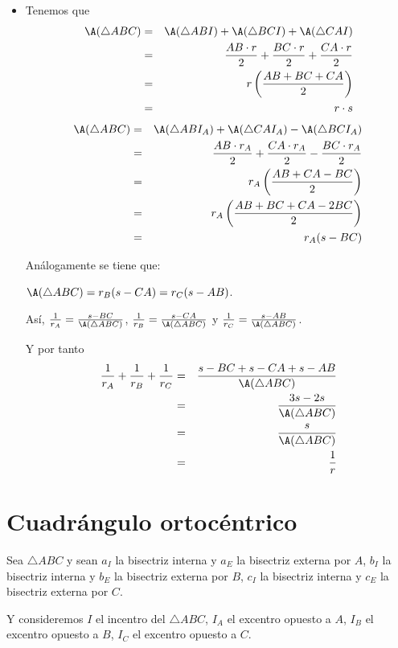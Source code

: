 \begin{itemize}
\item Tenemos que 
\begin{eqnarray*}
\A(\triangle ABC)
&=& \A(\triangle ABI)+\A(\triangle BCI)+\A(\triangle CAI)\\
&=& \frac{AB\cdot r}{2}+\frac{BC\cdot r}{2}+\frac{CA\cdot r}{2}\\
&=& r\left(\frac{AB+BC+CA}{2}\right)\\
&=& r\cdot s\\
\end{eqnarray*}
\begin{eqnarray*}
\A(\triangle ABC)
&=& \A(\triangle ABI_{A})+\A(\triangle CAI_{A})-\A(\triangle BCI_{A})\\
&=& \frac{AB\cdot r_{A}}{2}+\frac{CA\cdot r_{A}}{2}-\frac{BC\cdot r_{A}}{2}\\
&=& r_{A}\left(\frac{AB+CA-BC}{2}\right)\\
&=& r_{A}\left(\frac{AB+BC+CA-2BC}{2}\right)\\
&=& r_{A}(s-BC)\\
\end{eqnarray*}

Análogamente se tiene que:

$\A(\triangle ABC)=r_{B}(s-CA)=r_{C}(s-AB)$.

Así, $\frac{1}{r_{A}}=\frac{s-BC}{\A(\triangle ABC)}$, $\frac{1}{r_{B}}=\frac{s-CA}{\A(\triangle ABC)}$ y $\frac{1}{r_{C}}=\frac{s-AB}{\A(\triangle ABC)}$. 

Y por tanto 
\begin{eqnarray*}
\frac{1}{r_{A}}+\frac{1}{r_{B}}+\frac{1}{r_{C}}
&=& \frac{s-BC+s-CA+s-AB}{\A(\triangle ABC)}\\
&=& \frac{3s-2s}{\A(\triangle ABC)}\\
&=& \frac{s}{\A(\triangle ABC)}\\
&=& \frac{1}{r}\\
\end{eqnarray*}
\end{itemize}


\section{Cuadrángulo ortocéntrico}
Sea $\triangle ABC$ y sean $a_{I}$ la bisectriz interna y $a_{E}$ la bisectriz externa por $A$, $b_{I}$ la bisectriz interna y $b_{E}$ la bisectriz externa por $B$, $c_{I}$ la bisectriz interna y $c_{E}$ la bisectriz externa por $C$. 

Y consideremos $I$ el incentro del $\triangle ABC$, $I_{A}$ el excentro opuesto a $A$, $I_{B}$ el excentro opuesto a $B$, $I_{C}$ el excentro opuesto a $C$.

